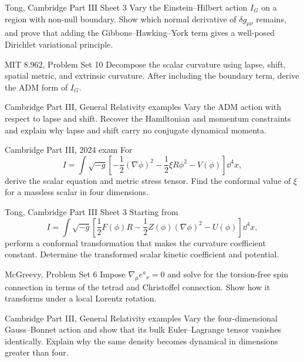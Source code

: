 \begin{exercise}{Tong, Cambridge Part III Sheet 3}
Vary the Einstein--Hilbert action \(I_G\) on a region with non-null boundary.
Show which normal derivative of \(\delta g_{\mu\nu}\) remains, and prove that
adding the Gibbons--Hawking--York term gives a well-posed Dirichlet variational
principle.
\end{exercise}

\begin{exercise}{MIT 8.962, Problem Set 10}
Decompose the scalar curvature using lapse, shift, spatial metric, and
extrinsic curvature.  After including the boundary term, derive the ADM form
of \(I_G\).
\end{exercise}

\begin{exercise}{Cambridge Part III, General Relativity examples}
Vary the ADM action with respect to lapse and shift.  Recover the Hamiltonian
and momentum constraints and explain why lapse and shift carry no conjugate
dynamical momenta.
\end{exercise}

\begin{exercise}{Cambridge Part III, 2024 exam}
For
\[
I=\int\sqrt{-g}\left[-\frac12(\nabla\phi)^2
-\frac12\xi R\phi^2-V(\phi)\right]\dd^4x,
\]
derive the scalar equation and metric stress tensor.  Find the conformal value
of \(\xi\) for a massless scalar in four dimensions.
\end{exercise}

\begin{exercise}{Tong, Cambridge Part III Sheet 3}
Starting from
\[
I=\int\sqrt{-g}\left[\frac12F(\phi)R
-\frac12Z(\phi)(\nabla\phi)^2-U(\phi)\right]\dd^4x,
\]
perform a conformal transformation that makes the curvature coefficient
constant.  Determine the transformed scalar kinetic coefficient and
potential.
\end{exercise}

\begin{exercise}{McGreevy, Problem Set 6}
Impose \(\nabla_\mu e^a{}_\nu=0\) and solve for the torsion-free spin
connection in terms of the tetrad and Christoffel connection.  Show how it
transforms under a local Lorentz rotation.
\end{exercise}

\begin{exercise}{Cambridge Part III, General Relativity examples}
Vary the four-dimensional Gauss--Bonnet action and show that its bulk
Euler--Lagrange tensor vanishes identically.  Explain why the same density
becomes dynamical in dimensions greater than four.
\end{exercise}

